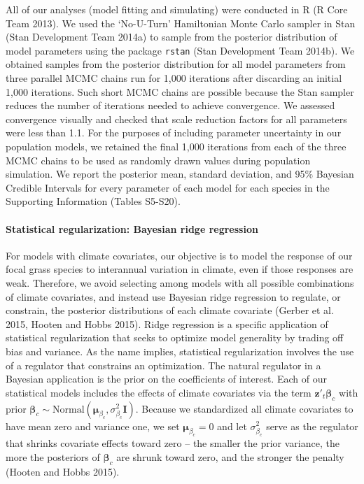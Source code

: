 \documentclass[12pt,]{article}
\let\oldparagraph\paragraph
\renewcommand{\paragraph}[1]{\oldparagraph{#1}\mbox{}}
\begin{document}
All of our analyses (model fitting and simulating) were conducted in R
(R Core Team 2013). We used the `No-U-Turn' Hamiltonian Monte Carlo
sampler in Stan (Stan Development Team 2014a) to sample from the
posterior distribution of model parameters using the package
\texttt{rstan} (Stan Development Team 2014b). We obtained samples from
the posterior distribution for all model parameters from three parallel
MCMC chains run for 1,000 iterations after discarding an initial 1,000
iterations. Such short MCMC chains are possible because the Stan sampler
reduces the number of iterations needed to achieve convergence. We
assessed convergence visually and checked that scale reduction factors
for all parameters were less than 1.1. For the purposes of including
parameter uncertainty in our population models, we retained the final
1,000 iterations from each of the three MCMC chains to be used as
randomly drawn values during population simulation. We report the
posterior mean, standard deviation, and 95\% Bayesian Credible Intervals
for every parameter of each model for each species in the Supporting
Information (Tables S5-S20).

\paragraph{Statistical regularization: Bayesian ridge
regression}\label{statistical-regularization-bayesian-ridge-regression}

For models with climate covariates, our objective is to model the
response of our focal grass species to interannual variation in climate,
even if those responses are weak. Therefore, we avoid selecting among
models with all possible combinations of climate covariates, and instead
use Bayesian ridge regression to regulate, or constrain, the posterior
distributions of each climate covariate (Gerber et al. 2015, Hooten and
Hobbs 2015). Ridge regression is a specific application of statistical
regularization that seeks to optimize model generality by trading off
bias and variance. As the name implies, statistical regularization
involves the use of a regulator that constrains an optimization. The
natural regulator in a Bayesian application is the prior on the
coefficients of interest. Each of our statistical models includes the
effects of climate covariates via the term
\(\textbf{z}'_t \boldsymbol{\beta}_c\) with prior
\(\boldsymbol{\beta}_c \sim \text{Normal}(\boldsymbol{\mu}_{\beta_c}, \sigma_{\beta_c}^2\textbf{I})\).
Because we standardized all climate covariates to have mean zero and
variance one, we set \(\boldsymbol{\mu}_{\beta_c} = 0\) and let
\(\sigma_{\beta_c}^2\) serve as the regulator that shrinks covariate
effects toward zero -- the smaller the prior variance, the more the
posteriors of \(\boldsymbol{\beta}_c\) are shrunk toward zero, and the
stronger the penalty (Hooten and Hobbs 2015).
\end{document}
